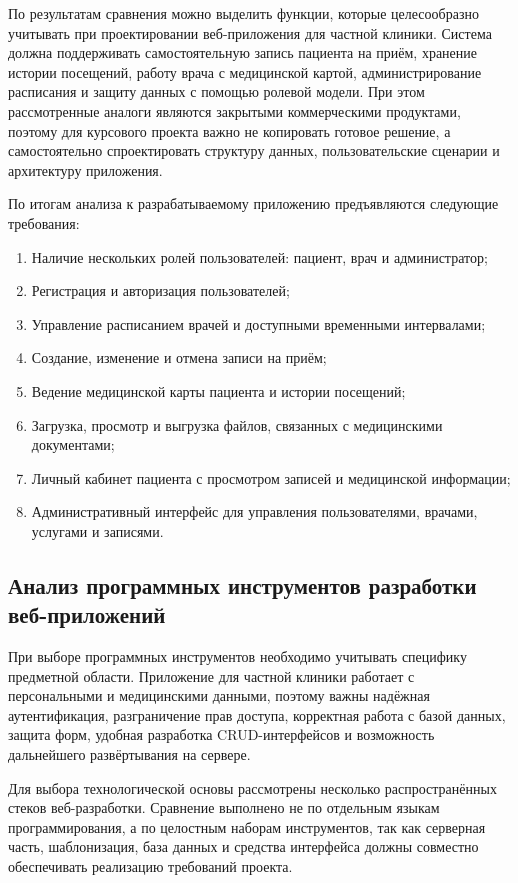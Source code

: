 По результатам сравнения можно выделить функции, которые целесообразно учитывать при проектировании веб-приложения для частной клиники. Система должна поддерживать самостоятельную запись пациента на приём, хранение истории посещений, работу врача с медицинской картой, администрирование расписания и защиту данных с помощью ролевой модели. При этом рассмотренные аналоги являются закрытыми коммерческими продуктами, поэтому для курсового проекта важно не копировать готовое решение, а самостоятельно спроектировать структуру данных, пользовательские сценарии и архитектуру приложения.

По итогам анализа к разрабатываемому приложению предъявляются следующие требования:

\begin{enumerate}
\item Наличие нескольких ролей пользователей: пациент, врач и администратор;
\item Регистрация и авторизация пользователей;
\item Управление расписанием врачей и доступными временными интервалами;
\item Создание, изменение и отмена записи на приём;
\item Ведение медицинской карты пациента и истории посещений;
\item Загрузка, просмотр и выгрузка файлов, связанных с медицинскими документами;
\item Личный кабинет пациента с просмотром записей и медицинской информации;
\item Административный интерфейс для управления пользователями, врачами, услугами и записями.
\end{enumerate}

\subsection{Анализ программных инструментов разработки веб-приложений}

При выборе программных инструментов необходимо учитывать специфику предметной области. Приложение для частной клиники работает с персональными и медицинскими данными, поэтому важны надёжная аутентификация, разграничение прав доступа, корректная работа с базой данных, защита форм, удобная разработка CRUD-интерфейсов и возможность дальнейшего развёртывания на сервере.

Для выбора технологической основы рассмотрены несколько распространённых стеков веб-разработки. Сравнение выполнено не по отдельным языкам программирования, а по целостным наборам инструментов, так как серверная часть, шаблонизация, база данных и средства интерфейса должны совместно обеспечивать реализацию требований проекта.



